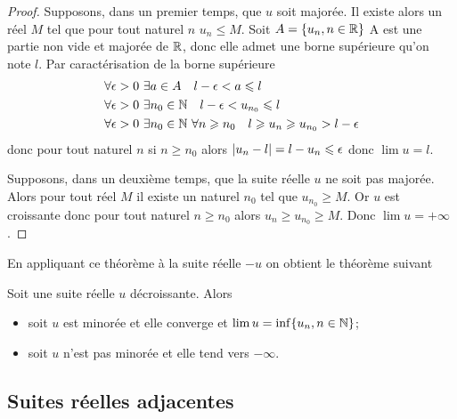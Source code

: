 \begin{proof}
  Supposons, dans un premier temps, que \(u\) soit majorée. Il existe alors un réel \(M\) tel que pour tout naturel \(n\) \(u_n \leqslant M\). Soit \(A=\{u_n, n \in \mathbb{R}\}\) A est une partie non vide et majorée de \(\mathbb{R}\), donc elle admet une borne supérieure qu'on note \(l\). Par caractérisation de la borne supérieure
  \begin{align}
      \forall \epsilon > 0 & \ \exists a \in A \quad l-\epsilon < a \leqslant l \\
      \forall \epsilon > 0 & \ \exists n_0 \in \mathbb{N} \quad l-\epsilon < u_{n_0} \leqslant l \\
      \forall \epsilon > 0 & \ \exists n_0 \in \mathbb{N} \ \forall n \geqslant n_0 \quad l \geqslant u_n \geqslant u_{n_0} > l-\epsilon
  \end{align}
donc pour tout naturel \(n\) si \(n \geqslant n_0\) alors \(\left\lvert u_n-l\right\rvert=l-u_n \leqslant \epsilon\) donc \(\lim u =l\).

Supposons, dans un deuxième temps, que la suite réelle \(u\) ne soit pas majorée. Alors pour tout réel \(M\) il existe un naturel \(n_0\) tel que \(u_{n_0} \geqslant M\). Or \(u\) est croissante donc pour tout naturel \(n \geqslant n_0\) alors \(u_n \geqslant u_{n_0} \geqslant M\). Donc \(\lim u =+\infty\).
\end{proof}
En appliquant ce théorème à la suite réelle \(-u\) on obtient le théorème suivant
\begin{theo}
  Soit une suite réelle \(u\) décroissante. Alors
  \begin{itemize}
  \item soit \(u\) est minorée et elle converge et \(\lim u = \inf\{u_n, n \in \mathbb{N}\}\);
  \item soit \(u\) n'est pas minorée et elle tend vers \(-\infty\).
  \end{itemize}
\end{theo}

\subsection{Suites réelles adjacentes}

